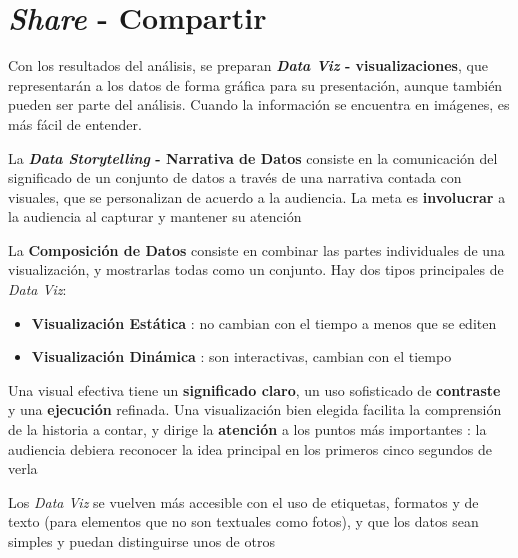 
\section{\textit{Share} - Compartir}
Con los resultados del análisis, se preparan \textbf{\textit{Data Viz} - visualizaciones}, que representarán a los datos de forma gráfica para su presentación, aunque también pueden ser parte del análisis. Cuando la información se encuentra en imágenes, es más fácil de entender. 

La \textbf{\textit{Data Storytelling} - Narrativa de Datos} consiste en la comunicación del significado de un conjunto de datos a través de una narrativa contada con visuales, que se personalizan de acuerdo a la audiencia. La meta es \textbf{involucrar} a la audiencia al capturar y mantener su atención

La \textbf{Composición de Datos} consiste en combinar las partes individuales de una visualización, y mostrarlas todas como un conjunto. Hay dos tipos principales de \textit{Data Viz}:
\begin{itemize}
    \item {\textbf{Visualización Estática} : no cambian con el tiempo a menos que se editen}
    \item {\textbf{Visualización Dinámica} : son interactivas, cambian con el tiempo}
\end{itemize}
Una visual efectiva tiene un \textbf{significado claro}, un uso sofisticado de \textbf{contraste} y una \textbf{ejecución} refinada. Una visualización bien elegida facilita la comprensión de la historia a contar, y dirige la \textbf{atención} a los puntos más importantes : la audiencia debiera reconocer la idea principal en los primeros cinco segundos de verla

Los \textit{Data Viz} se vuelven más accesible con el uso de etiquetas, formatos y de texto (para elementos que no son textuales como fotos), y que los datos sean simples y puedan distinguirse unos de otros

